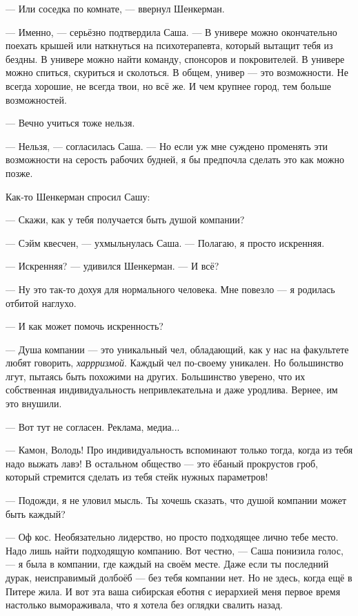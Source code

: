 --- Или соседка по комнате, --- ввернул Шенкерман.

--- Именно, --- серьёзно подтвердила Саша.
--- В универе можно окончательно поехать крышей или наткнуться на психотерапевта, который вытащит тебя из бездны.
В универе можно найти команду, спонсоров и покровителей.
В универе можно спиться, скуриться и сколоться.
В общем, универ --- это возможности.
Не всегда хорошие, не всегда твои, но всё же.
И чем крупнее город, тем больше возможностей.

--- Вечно учиться тоже нельзя.

--- Нельзя, --- согласилась Саша.
--- Но если уж мне суждено променять эти возможности на серость рабочих будней, я бы предпочла сделать это как можно позже.

Как-то Шенкерман спросил Сашу:

--- Скажи, как у тебя получается быть душой компании?

--- Сэйм квесчен, --- ухмыльнулась Саша.
--- Полагаю, я просто искренняя.

--- Искренняя? --- удивился Шенкерман.
--- И всё?

--- Ну это так-то дохуя для нормального человека.
Мне повезло --- я родилась отбитой наглухо.

--- И как может помочь искренность?

--- Душа компании --- это уникальный чел, обладающий, как у нас на факультете любят говорить, \emph{харрризмой}.
Каждый чел по-своему уникален.
Но большинство лгут, пытаясь быть похожими на других.
Большинство уверено, что их собственная индивидуальность непривлекательна и даже уродлива.
Вернее, им это внушили.

--- Вот тут не согласен.
Реклама, медиа...

--- Камон, Володь!
Про индивидуальность вспоминают только тогда, когда из тебя надо выжать лавэ!
В остальном общество --- это ёбаный прокрустов гроб, который стремится сделать из тебя стейк нужных параметров!

--- Подожди, я не уловил мысль.
Ты хочешь сказать, что душой компании может быть каждый?

--- Оф кос.
Необязательно лидерство, но просто подходящее лично тебе место.
Надо лишь найти подходящую компанию.
Вот честно, --- Саша понизила голос, --- я была в компании, где каждый на своём месте.
Даже если ты последний дурак, неисправимый долбоёб --- без тебя компании нет.
Но не здесь, когда ещё в Питере жила.
И вот эта ваша сибирская еботня с иерархией меня первое время настолько вымораживала, что я хотела без оглядки свалить назад.

